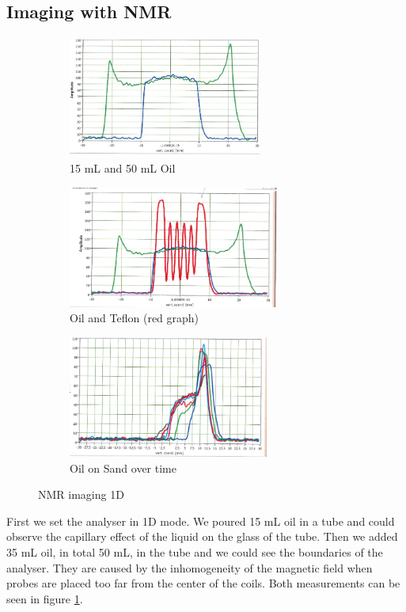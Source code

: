\subsection{Imaging with NMR}\label{imaging-with-nmr}
\begin{figure}[h]
	\begin{subfigure}{0.32\textwidth}
	\includegraphics[width=0.9\linewidth ,height=4cm]{images/oil15_50.png}
	\caption{15 mL and 50 mL Oil}
	\label{NMR1}
	\end{subfigure}
	\begin{subfigure}{0.32\textwidth}
	\includegraphics[width=0.9\linewidth ,height=4cm]{images/oil_teflon.png}
	\caption{Oil and Teflon (red graph)}
	\label{NMR2}
	\end{subfigure}
	\begin{subfigure}{0.32\textwidth}
	\includegraphics[width=0.9\linewidth, height=4cm]{images/oil_sand.png}
	\caption{Oil on Sand over time}
	\label{NMR3}
	\end{subfigure}
	\caption{NMR imaging 1D}
\end{figure}
First we set the analyser in 1D mode. We poured 15 mL oil in a tube and could observe the capillary effect of the liquid on the glass of the tube. Then we added 35 mL oil, in total 50 mL, in the tube and we could see the boundaries of the analyser. They are caused by the inhomogeneity of the magnetic field when probes are placed too far from the center of the coils. Both measurements can be seen in figure \ref{NMR1}. \\
